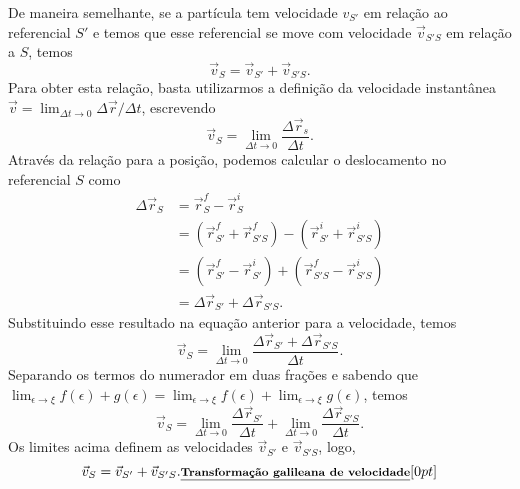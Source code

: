 De maneira semelhante, se a partícula tem velocidade $v_{S'}$ em relação ao referencial $S'$ e temos que esse referencial se move com velocidade $\vec{v}_{S'S}$ em relação a $S$, temos
\begin{equation}
  \vec{v}_S = \vec{v}_{S'} + \vec{v}_{S'S}.
\end{equation}
Para obter esta relação, basta utilizarmos a definição da velocidade instantânea $\vec{v} = \lim_{\Delta t \to 0} \Delta \vec{r} / \Delta t$, escrevendo
\begin{equation}
  \vec{v}_S = \lim_{\Delta t \to 0} \frac{\Delta \vec{r}_s}{\Delta t}.
\end{equation}
%
Através da relação para a posição, podemos calcular o deslocamento no referencial $S$ como
\begin{align}
  \Delta \vec{r}_S &= \vec{r}_S^f - \vec{r}_S^i \\
  &= (\vec{r}_{S'}^f + \vec{r}_{S'S}^f) - (\vec{r}_{S'}^i + \vec{r}_{S'S}^i) \\
  &= (\vec{r}_{S'}^f - \vec{r}_{S'}^i) + (\vec{r}_{S'S}^f - \vec{r}_{S'S}^i) \\
  &= \Delta \vec{r}_{S'} + \Delta \vec{r}_{S'S}.
\end{align}
%
Substituindo esse resultado na equação anterior para a velocidade, temos
\begin{equation}
  \vec{v}_S = \lim_{\Delta t \to 0} \frac{\Delta \vec{r}_{S'} + \Delta \vec{r}_{S'S}}{\Delta t}.
\end{equation}
%
Separando os termos do numerador em duas frações e sabendo que $\lim_{\epsilon \to \xi} f(\epsilon) + g(\epsilon) = \lim_{\epsilon \to \xi} f(\epsilon) + \lim_{\epsilon \to \xi} g(\epsilon)$, temos
\begin{equation}
  \vec{v}_S = \lim_{\Delta t \to 0} \frac{\Delta\vec{r}_{S'}}{\Delta t} + \lim_{\Delta t \to 0} \frac{\Delta \vec{r}_{S'S}}{\Delta t}.
\end{equation}
%
Os limites acima definem as velocidades $\vec{v}_{S'}$ e $\vec{v}_{S'S}$, logo,
\begin{equation}
  \vec{v}_S = \vec{v}_{S'} + \vec{v}_{S'S}. \relax{\footnotesize\emph{\textbf{Transformação galileana de velocidade}}}[0pt]
\end{equation}


